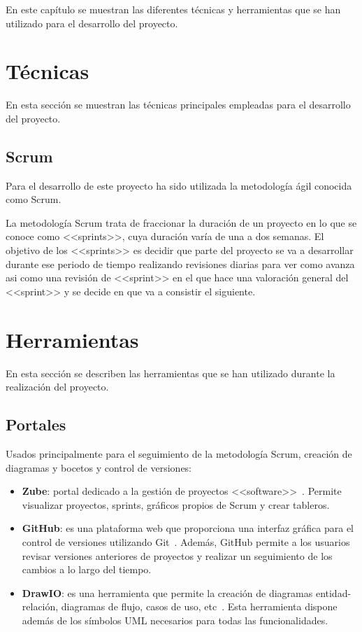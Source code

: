 
En este capítulo se muestran las diferentes técnicas y herramientas que se han utilizado para el desarrollo del proyecto.


\section{Técnicas}

En esta sección se muestran las técnicas principales empleadas para el desarrollo del proyecto.

\subsection{Scrum}

Para el desarrollo de este proyecto ha sido utilizada la metodología ágil conocida como Scrum.

La metodología Scrum trata de fraccionar la duración de un proyecto en lo que se conoce como <<sprints>>, cuya duración varía de una a dos semanas.
El objetivo de los <<sprints>> es decidir que parte del proyecto se va a desarrollar durante ese periodo de tiempo realizando revisiones diarias para ver como avanza asi como una revisión de <<sprint>> en el que hace una valoración general del <<sprint>> y se decide en que va a consistir el siguiente.

\section{Herramientas}

En esta sección se describen las herramientas que se han utilizado durante la realización del proyecto.

\subsection{Portales}

Usados principalmente para el seguimiento de la metodología Scrum, creación de diagramas y bocetos y control de versiones:
\begin{itemize}
\item \textbf{Zube}: portal dedicado a la gestión de proyectos <<software>>~\cite{zubeHome}. Permite visualizar proyectos, sprints,
gráficos propios de Scrum y crear tableros.
\item \textbf{GitHub}: es una plataforma web que proporciona una interfaz gráfica para el control de versiones utilizando Git~\cite{githubHome}. Además, GitHub permite a los usuarios revisar versiones anteriores de proyectos y realizar un seguimiento de los cambios a lo largo del tiempo.
\item \textbf{DrawIO}: es una herramienta que permite la creación de diagramas entidad-relación, diagramas de flujo, casos de uso, etc~\cite{drawioHome}. Esta herramienta dispone además de los símbolos UML necesarios para todas las funcionalidades.
\end{itemize}

